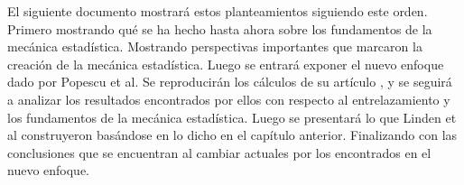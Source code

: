 El siguiente documento mostrará estos planteamientos siguiendo este orden. Primero mostrando qué se ha hecho hasta ahora sobre los fundamentos de la mecánica estadística. Mostrando perspectivas importantes que marcaron la creación de la mecánica estadística. Luego se entrará exponer el nuevo enfoque dado por Popescu et al. Se reproducirán los cálculos de su artículo \cite{Popescu2006}, y se seguirá a analizar los resultados encontrados por ellos con respecto al entrelazamiento y los fundamentos de la mecánica estadística. Luego se presentará lo que Linden et al construyeron basándose en lo dicho en el capítulo anterior. Finalizando con las conclusiones que se encuentran al cambiar actuales por los encontrados en el nuevo enfoque.



